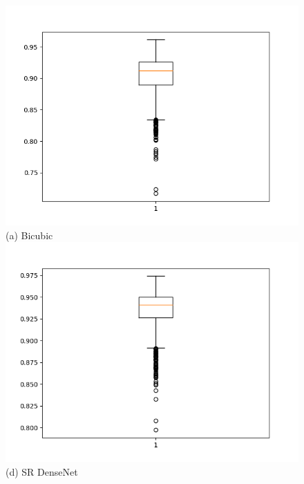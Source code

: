 \documentclass[conference]{IEEEtran}
\begin{document}
\begin{figure}[h!]
  \centering
  \begin{minipage}{0.3\textwidth}
    \centering
    \includegraphics[width=\textwidth,height=0.2\textheight]{Figures/bicubic_ssim_rgb.png}
    (a) Bicubic
    \includegraphics[width=\textwidth,height=0.2\textheight]{Figures/dense_ssim_rgb.png}
    (d) SR DenseNet
  \end{minipage}%
  \begin{minipage}{0.3\textwidth}
  \centering

\end{minipage}
\end{figure}
\end{document}
